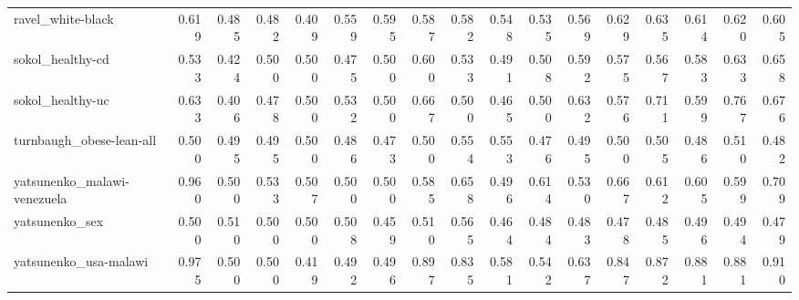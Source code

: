 \begin{tabular}{lrrrrrrrrrrrrrrrr}
ravel_white-black & 0.619 & 0.485 & 0.482 & 0.409 & 0.559 & 0.595 & 0.587 & 0.582 & 0.548 & 0.535 & 0.569 & 0.629 & 0.635 & 0.614 & 0.620 & 0.605 \\
sokol_healthy-cd & 0.533 & 0.424 & 0.500 & 0.500 & 0.475 & 0.500 & 0.600 & 0.533 & 0.491 & 0.508 & 0.592 & 0.575 & 0.567 & 0.583 & 0.633 & 0.658 \\
sokol_healthy-uc & 0.633 & 0.406 & 0.478 & 0.500 & 0.532 & 0.500 & 0.667 & 0.500 & 0.465 & 0.500 & 0.632 & 0.576 & 0.711 & 0.599 & 0.767 & 0.676 \\
turnbaugh_obese-lean-all & 0.500 & 0.495 & 0.495 & 0.500 & 0.486 & 0.473 & 0.500 & 0.554 & 0.553 & 0.476 & 0.495 & 0.500 & 0.505 & 0.486 & 0.510 & 0.482 \\
yatsunenko_malawi-venezuela & 0.960 & 0.500 & 0.533 & 0.507 & 0.500 & 0.500 & 0.585 & 0.658 & 0.496 & 0.614 & 0.530 & 0.667 & 0.612 & 0.605 & 0.599 & 0.709 \\
yatsunenko_sex & 0.500 & 0.510 & 0.500 & 0.500 & 0.508 & 0.459 & 0.510 & 0.565 & 0.464 & 0.484 & 0.483 & 0.478 & 0.485 & 0.496 & 0.494 & 0.479 \\
yatsunenko_usa-malawi & 0.975 & 0.500 & 0.500 & 0.419 & 0.492 & 0.496 & 0.897 & 0.835 & 0.581 & 0.542 & 0.637 & 0.847 & 0.872 & 0.881 & 0.881 & 0.910 \\
\bottomrule
\end{tabular}
